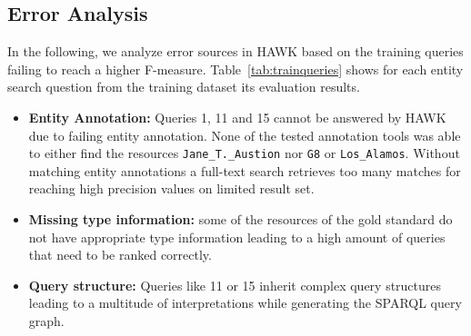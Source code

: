 \subsection{Error Analysis}

In the following, we analyze error sources in HAWK based on the training queries failing to reach a higher F-measure.
Table~\ref{tab:trainqueries} shows for each entity search question from the training dataset its evaluation results.
\begin{itemize}
\item \textbf{Entity Annotation: } Queries 1, 11 and 15 cannot be answered by HAWK due to failing entity annotation. None of the tested annotation tools was able to either find the resources  \texttt{Jane\_T.\_Austion} nor \texttt{G8} or \texttt{Los\_Alamos}. 
Without matching entity annotations a full-text search retrieves too many matches for reaching high precision values on limited result set.
\item \textbf{Missing type information:} some of the resources of the gold standard do not have appropriate type information leading to a high amount of queries that need to be ranked correctly.
\item \textbf{Query structure: } Queries like 11 or 15 inherit complex query structures leading to a multitude of interpretations while generating the SPARQL query graph.
\end{itemize}

